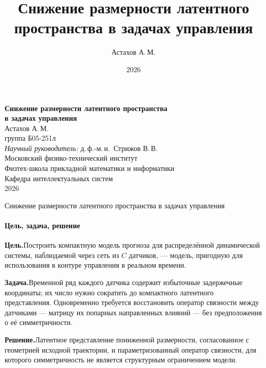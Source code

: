 \documentclass[10pt]{beamer}
\title{Снижение размерности латентного пространства в задачах управления}
\author{Астахов А.\,М.}
\institute{МФТИ}
\date{2026}
\begin{document}
\begin{frame}[plain]
\begin{center}
{\Large\textbf{Снижение размерности латентного пространства\\[1pt]
в задачах управления}}\\[12mm]
{\large Астахов А.\,М.}\\[2mm]
группа Б05-251л\\[5mm]
\textit{Научный руководитель:} д.\,ф.-м.\,н.\ Стрижов В.\,В.\\[8mm]
\small
Московский физико-технический институт\\
Физтех-школа прикладной математики и информатики\\
Кафедра интеллектуальных систем\\[4mm]
2026
\end{center}
\end{frame}


\begin{frame}{Снижение размерности латентного пространства в задачах управления}
\framesubtitle{Цель, задача, решение}
\footnotesize

\textbf{Цель.}\quad Построить компактную модель прогноза для распределённой
динамической системы, наблюдаемой через сеть из $C$ датчиков, --- модель,
пригодную для использования в контуре управления в реальном времени.

\medskip
\textbf{Задача.}\quad Временной ряд каждого датчика содержит избыточные
задержечные координаты; их число нужно сократить до компактного латентного
представления. Одновременно требуется восстановить оператор связности между
датчиками --- матрицу их попарных направленных влияний --- без
предположения о её симметричности.

\medskip
\textbf{Решение.}\quad Латентное представление пониженной размерности,
согласованное с геометрией исходной траектории, и параметризованный оператор
связности, для которого симметричность не является структурным
ограничением модели.
\end{frame}
\end{document}
